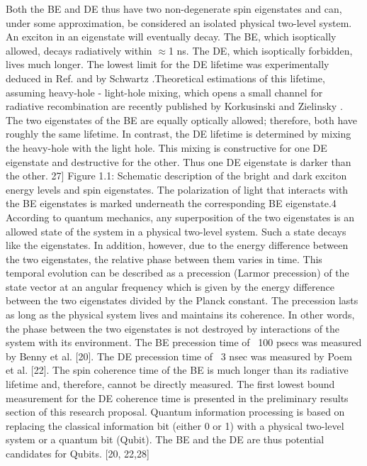 Both the BE and DE thus have two non-degenerate spin eigenstates and can, under some approximation, be considered an isolated physical two-level system. An exciton in an eigenstate will eventually decay. The BE, which isoptically allowed, decays radiatively within $\approx$1 ns. The DE, which isoptically forbidden, lives much longer. The lowest limit for the DE lifetime was experimentally deduced in Ref. \cite{McFarlane2009} and by Schwartz \cite{Schwartz_2015}.Theoretical estimations of this lifetime, assuming heavy-hole - light-hole mixing, which opens a small channel for radiative recombination are recently published by Korkusinski \cite{Korkusinski2013} and Zielinsky \cite{Zielinski2013}. The two eigenstates of the BE are equally optically allowed; therefore, both have roughly the same lifetime.
In contrast, the DE lifetime is determined by mixing the heavy-hole with the light hole. This mixing is constructive for one DE eigenstate and destructive for the other. Thus one DE eigenstate is darker than the other.
27]
Figure ‎1.1: Schematic description of the bright and dark exciton energy levels and spin eigenstates. The polarization of light that interacts with the BE eigenstates is marked underneath the corresponding BE eigenstate.4
According to quantum mechanics, any superposition of the two eigenstates is an allowed state of the system in a physical two-level system. Such a state decays like the eigenstates. In addition, however, due to the energy difference between the two eigenstates, the relative phase between them varies in time. This temporal evolution can be described as a precession (Larmor precession) of the state vector at an angular frequency which is given by the energy difference between the two eigenstates divided by the Planck constant. The precession lasts as long as the physical system lives and maintains its coherence. In other words, the phase between the two eigenstates is not destroyed by interactions of the system with its environment. The BE precession time of ~100 psecs was measured by Benny et al. [20]. The DE precession time of ~3 nsec was measured by Poem et al. [22]. The spin coherence time of the BE is much longer than its radiative lifetime and, therefore, cannot be directly measured. The first lowest bound measurement for the DE coherence time is presented in the preliminary results section of this research proposal.
Quantum information processing is based on replacing the classical information bit (either 0 or 1) with a physical two-level system or a quantum bit (Qubit). The BE and the DE are thus potential candidates for Qubits. [20, 22,28]

